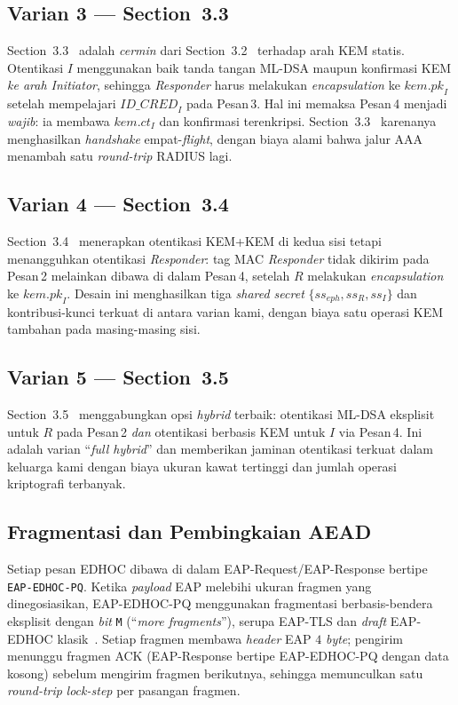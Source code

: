 \documentclass{easychair}
\newcommand{\VarSec}[1]{Section~#1~\cite{pq-edhoc-draft}}
\begin{document}
\subsection{Varian 3 --- \texorpdfstring{\VarSec{3.3}}{Section 3.3 dari draft}}
\label{sec:variant-s33}
\VarSec{3.3} adalah \emph{cermin} dari \VarSec{3.2} terhadap arah KEM
statis. Otentikasi $I$ menggunakan baik tanda tangan ML-DSA maupun
konfirmasi KEM \emph{ke arah Initiator}, sehingga \emph{Responder}
harus melakukan \emph{encapsulation} ke $\mathit{kem.pk}_I$ setelah
mempelajari $\mathit{ID\_CRED}_I$ pada Pesan\,3. Hal ini memaksa
Pesan\,4 menjadi \emph{wajib}: ia membawa $\mathit{kem.ct}_I$ dan
konfirmasi terenkripsi. \VarSec{3.3} karenanya menghasilkan
\emph{handshake} empat-\emph{flight}, dengan biaya alami bahwa jalur
AAA menambah satu \emph{round-trip} RADIUS lagi.

\subsection{Varian 4 --- \texorpdfstring{\VarSec{3.4}}{Section 3.4 dari draft}}
\label{sec:variant-s34}
\VarSec{3.4} menerapkan otentikasi KEM+KEM di kedua sisi tetapi
menangguhkan otentikasi \emph{Responder}: tag MAC \emph{Responder}
tidak dikirim pada Pesan\,2 melainkan dibawa di dalam Pesan\,4,
setelah $R$ melakukan \emph{encapsulation} ke $\mathit{kem.pk}_I$.
Desain ini menghasilkan tiga \emph{shared secret}
$\{\mathit{ss}_{\mathit{eph}},\mathit{ss}_R,\mathit{ss}_I\}$ dan
kontribusi-kunci terkuat di antara varian kami, dengan biaya satu
operasi KEM tambahan pada masing-masing sisi.

\subsection{Varian 5 --- \texorpdfstring{\VarSec{3.5}}{Section 3.5 dari draft}}
\label{sec:variant-s35}
\VarSec{3.5} menggabungkan opsi \emph{hybrid} terbaik: otentikasi
ML-DSA eksplisit untuk $R$ pada Pesan\,2 \emph{dan} otentikasi
berbasis KEM untuk $I$ via Pesan\,4. Ini adalah varian ``\emph{full
hybrid}'' dan memberikan jaminan otentikasi terkuat dalam keluarga
kami dengan biaya ukuran kawat tertinggi dan jumlah operasi
kriptografi terbanyak.

\subsection{Fragmentasi dan Pembingkaian AEAD}
Setiap pesan EDHOC dibawa di dalam EAP-Request/EAP-Response bertipe
\texttt{EAP-EDHOC-PQ}. Ketika \emph{payload} EAP melebihi ukuran
fragmen yang dinegosiasikan, EAP-EDHOC-PQ menggunakan fragmentasi
berbasis-bendera eksplisit dengan \emph{bit} \texttt{M} (``\emph{more
fragments}''), serupa EAP-TLS dan \emph{draft} EAP-EDHOC
klasik~\cite{RFC-EAP-EDHOC,LopezGomez2026}. Setiap fragmen membawa
\emph{header} EAP $4$ \emph{byte}; pengirim menunggu fragmen ACK
(EAP-Response bertipe EAP-EDHOC-PQ dengan data kosong) sebelum
mengirim fragmen berikutnya, sehingga memunculkan satu \emph{round-trip}
\emph{lock-step} per pasangan fragmen.
\end{document}
